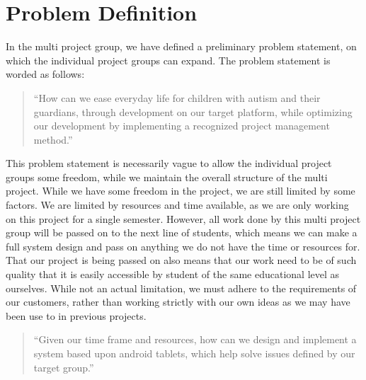 \section{Problem Definition}
In the multi project group, we have defined a preliminary problem statement, on which the individual project groups can expand.
The problem statement is worded as follows: 
\begin{quotation}
 ``How can we ease everyday life for children with autism and their guardians, through development on our target platform,
 while optimizing our development by implementing a recognized project management method.''
\end{quotation}

This problem statement is necessarily vague to allow the individual project groups some freedom, while we maintain the overall structure of the multi project.
While we have some freedom in the project, we are still limited by some factors.
We are limited by resources and time available, as we are only working on this project for a single semester. However, all work done by this multi project group
will be passed on to the next line of students, which means we can make a full system design and pass on anything we do not have the time or resources for.
That our project is being passed on also means that our work need to be of such quality that it is easily accessible by student of the same educational level as ourselves.
While not an actual limitation, we must adhere to the requirements of our customers, rather than working strictly with our own ideas as we may have been use to in previous projects.

\begin{quotation}
 ``Given our time frame and resources, how can we design and implement a system based upon android tablets, which help solve issues defined by our target group.''
\end{quotation}




  



